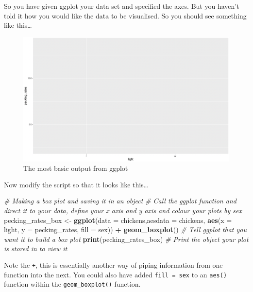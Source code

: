\documentclass[
]{book}
\newenvironment{Shaded}{\begin{snugshade}}{\end{snugshade}}
\newcommand{\AttributeTok}[1]{\textcolor[rgb]{0.13,0.29,0.53}{#1}}
\newcommand{\CommentTok}[1]{\textcolor[rgb]{0.56,0.35,0.01}{\textit{#1}}}
\newcommand{\FunctionTok}[1]{\textcolor[rgb]{0.13,0.29,0.53}{\textbf{#1}}}
\newcommand{\NormalTok}[1]{#1}
\newcommand{\OtherTok}[1]{\textcolor[rgb]{0.56,0.35,0.01}{#1}}
\newcommand{\SpecialCharTok}[1]{\textcolor[rgb]{0.81,0.36,0.00}{\textbf{#1}}}
\begin{document}
So you have given ggplot your data set and specified the axes. But you haven't told it how you would like the data to be visualised. So you should see something like this\ldots{}

\begin{figure}
\includegraphics[width=0.9\linewidth]{figures/pecking_rates_1} \caption{The most basic output from ggplot}\label{fig:unnamed-chunk-80}
\end{figure}

Now modify the script so that it looks like this\ldots{}

\begin{Shaded}
\begin{Highlighting}[]
\CommentTok{\# Making a box plot and saving it in an object}
\CommentTok{\# Call the ggplot function and direct it to your data, define your x axis and y axis and colour your plots by sex}
\NormalTok{pecking\_rates\_box }\OtherTok{\textless{}{-}} \FunctionTok{ggplot}\NormalTok{(}\AttributeTok{data =}\NormalTok{ chickens,}\AttributeTok{aesdata =}\NormalTok{ chickens, }\FunctionTok{aes}\NormalTok{(}\AttributeTok{x =}\NormalTok{ light, }\AttributeTok{y =}\NormalTok{ pecking\_rates, }\AttributeTok{fill =}\NormalTok{ sex)) }\SpecialCharTok{+}
  \FunctionTok{geom\_boxplot}\NormalTok{() }\CommentTok{\# Tell ggplot that you want it to build a box plot}
\FunctionTok{print}\NormalTok{(pecking\_rates\_box) }\CommentTok{\# Print the object your plot is stored in to view it}
\end{Highlighting}
\end{Shaded}

Note the \texttt{+}, this is essentially another way of piping information from one function into the next. You could also have added \texttt{fill\ =\ sex} to an \texttt{aes()} function within the \texttt{geom\_boxplot()} function.
\end{document}
